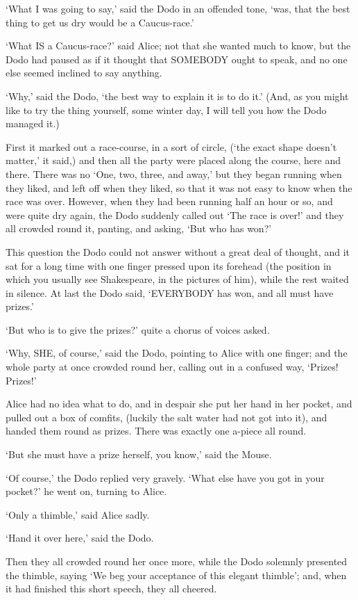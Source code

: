 \documentclass[12pt]{book}
\begin{document}
\begin{Parallel}[p]{}{}
{‘What I was going to say,’ said the Dodo in an offended tone, ‘was, that the best thing to get us dry would be a Caucus-race.’

‘What IS a Caucus-race?’ said Alice; not that she wanted much to know, but the Dodo had paused as if it thought that SOMEBODY ought to speak, and no one else seemed inclined to say anything.

‘Why,’ said the Dodo, ‘the best way to explain it is to do it.’ (And, as you might like to try the thing yourself, some winter day, I will tell you how the Dodo managed it.)

First it marked out a race-course, in a sort of circle, (‘the exact shape doesn’t matter,’ it said,) and then all the party were placed along the course, here and there. There was no ‘One, two, three, and away,’ but they began running when they liked, and left off when they liked, so that it was not easy to know when the race was over. However, when they had been running half an hour or so, and were quite dry again, the Dodo suddenly called out ‘The race is over!’ and they all crowded round it, panting, and asking, ‘But who has won?’

This question the Dodo could not answer without a great deal of thought, and it sat for a long time with one finger pressed upon its forehead (the position in which you usually see Shakespeare, in the pictures of him), while the rest waited in silence. At last the Dodo said, ‘EVERYBODY has won, and all must have prizes.’

‘But who is to give the prizes?’ quite a chorus of voices asked.

‘Why, SHE, of course,’ said the Dodo, pointing to Alice with one finger; and the whole party at once crowded round her, calling out in a confused way, ‘Prizes! Prizes!’

Alice had no idea what to do, and in despair she put her hand in her pocket, and pulled out a box of comfits, (luckily the salt water had not got into it), and handed them round as prizes. There was exactly one a-piece all round.

‘But she must have a prize herself, you know,’ said the Mouse.

‘Of course,’ the Dodo replied very gravely. ‘What else have you got in your pocket?’ he went on, turning to Alice.

‘Only a thimble,’ said Alice sadly.

‘Hand it over here,’ said the Dodo.

Then they all crowded round her once more, while the Dodo solemnly presented the thimble, saying ‘We beg your acceptance of this elegant thimble’; and, when it had finished this short speech, they all cheered.

}
\end{Parallel}
\end{document}

